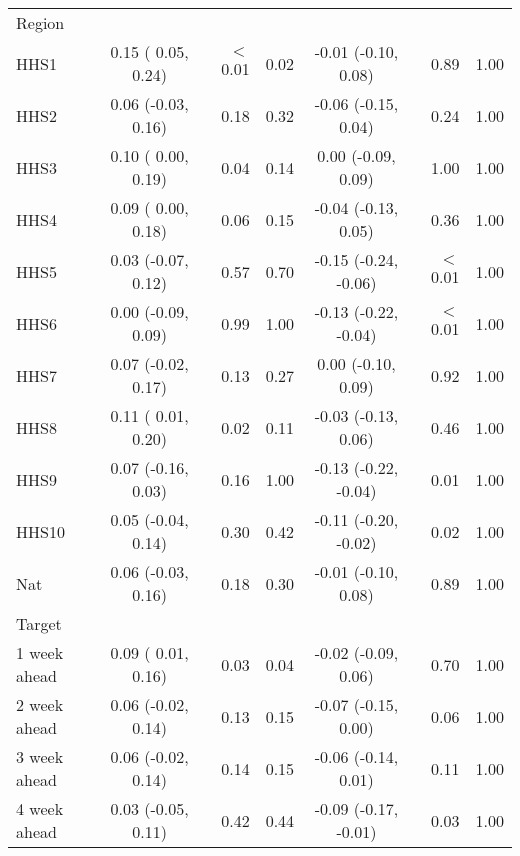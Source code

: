 \documentclass[sagev,times,Review,10pt]{sagej}
\begin{document}
\begin{appendix}
\begin{table}[ht!]
\begin{tabular}{lcrrcrr}
 Region\\    
 \hspace{3mm}	HHS1            & 0.15 ( 0.05, 0.24) & $<$0.01 & 0.02      & -0.01 (-0.10,  0.08) & 0.89    & 1.00 \\
 \hspace{3mm}	HHS2            & 0.06 (-0.03, 0.16) & 0.18    & 0.32      & -0.06 (-0.15,  0.04) & 0.24    & 1.00 \\
 \hspace{3mm}	HHS3            & 0.10 ( 0.00, 0.19) & 0.04    & 0.14      &  0.00 (-0.09,  0.09) & 1.00    & 1.00 \\
 \hspace{3mm}	HHS4            & 0.09 ( 0.00, 0.18) & 0.06    & 0.15      & -0.04 (-0.13,  0.05) & 0.36    & 1.00 \\
 \hspace{3mm}	HHS5            & 0.03 (-0.07, 0.12) & 0.57    & 0.70      & -0.15 (-0.24, -0.06) & $<$0.01 & 1.00 \\
 \hspace{3mm}	HHS6            & 0.00 (-0.09, 0.09) & 0.99    & 1.00      & -0.13 (-0.22, -0.04) & $<$0.01 & 1.00 \\
 \hspace{3mm}	HHS7            & 0.07 (-0.02, 0.17) & 0.13    & 0.27      &  0.00 (-0.10,  0.09) & 0.92    & 1.00 \\
 \hspace{3mm}	HHS8            & 0.11 ( 0.01, 0.20) & 0.02    & 0.11      & -0.03 (-0.13,  0.06) & 0.46    & 1.00 \\
 \hspace{3mm}	HHS9            & 0.07 (-0.16, 0.03) & 0.16    & 1.00      & -0.13 (-0.22, -0.04) & 0.01    & 1.00 \\
 \hspace{3mm}	HHS10           & 0.05 (-0.04, 0.14) & 0.30    & 0.42      & -0.11 (-0.20, -0.02) & 0.02    & 1.00 \\
 \hspace{3mm}	Nat             & 0.06 (-0.03, 0.16) & 0.18    & 0.30      & -0.01 (-0.10,  0.08) & 0.89    & 1.00 \\

 Target\\
 \hspace{3mm}	1 week ahead	&  0.09 ( 0.01, 0.16) & 0.03 & 0.04  & -0.02 (-0.09,  0.06) & 0.70 & 1.00 \\
 \hspace{3mm}	2 week ahead	&  0.06 (-0.02, 0.14) & 0.13 & 0.15  & -0.07 (-0.15,  0.00) & 0.06 & 1.00 \\
 \hspace{3mm}	3 week ahead	&  0.06 (-0.02, 0.14) & 0.14 & 0.15  & -0.06 (-0.14,  0.01) & 0.11 & 1.00 \\
 \hspace{3mm}	4 week ahead	&  0.03 (-0.05, 0.11) & 0.42 & 0.44  & -0.09 (-0.17, -0.01) & 0.03 & 1.00 \\
 \hline
\end{tabular}


\end{table}
\end{appendix}
\end{document}
